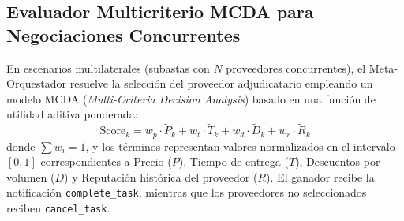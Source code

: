 \subsection{Evaluador Multicriterio MCDA para Negociaciones Concurrentes}
En escenarios multilaterales (subastas con $N$ proveedores concurrentes), el Meta-Orquestador resuelve la selección del proveedor adjudicatario empleando un modelo MCDA (\textit{Multi-Criteria Decision Analysis}) basado en una función de utilidad aditiva ponderada:
\begin{equation}
    \text{Score}_k = w_p \cdot \widetilde{P}_k + w_t \cdot \widetilde{T}_k + w_d \cdot \widetilde{D}_k + w_r \cdot \widetilde{R}_k
\end{equation}
donde $\sum w_i = 1$, y los términos representan valores normalizados en el intervalo $[0, 1]$ correspondientes a Precio ($P$), Tiempo de entrega ($T$), Descuentos por volumen ($D$) y Reputación histórica del proveedor ($R$).
El ganador recibe la notificación \texttt{complete\_task}, mientras que los proveedores no seleccionados reciben \texttt{cancel\_task}.
